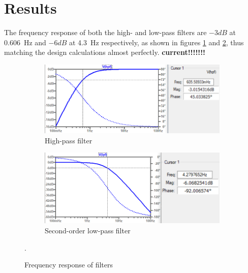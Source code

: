 \section{Results} \label{sec:heartResults}
The frequency response of both the high- and low-pass filters are $-3dB$ at \SI{0.606}{Hz} and $-6dB$ at \SI{4.3}{Hz} respectively, as shown in figures \ref{subfig:hpf} and \ref{subfig:lpf1}, thus matching the design calculations almost perfectly. \textbf{current!!!!!!!}
\begin{figure}
 \footnotesize
   \centering
   \begin{subfigure}[]{0.48\textwidth}
        \includegraphics[width=\linewidth]{./Figures/hpf}
	  \caption{High-pass filter} \label{subfig:hpf}	
   \end{subfigure}
   \begin{subfigure}[]{0.48\textwidth}
  	 \includegraphics[width=\linewidth]{./Figures/lpf1}
	  \caption{Second-order low-pass filter} \label{subfig:lpf1}	
   \end{subfigure}
      
   \caption {Frequency response of filters}.
   \label{fig:freqreq}
 \end{figure}

